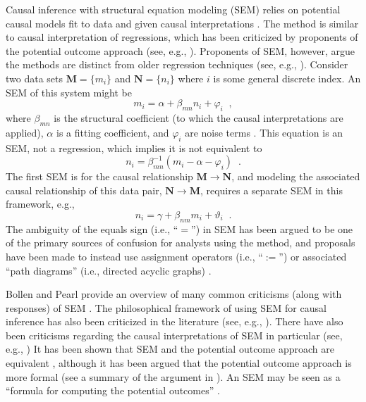 Causal inference with structural equation modeling (SEM) relies on potential causal models fit to data and given causal interpretations \cite{Anderson1988,Pearl2012,Bollen2013,Bollen2014}.  The method is similar to causal interpretation of regressions, which has been criticized by proponents of the potential outcome approach (see, e.g., \cite{Holland1986}).  Proponents of SEM, however, argue the methods are distinct from older regression techniques (see, e.g., \cite{Bollen2013}).  Consider two data sets $\mathbf{M}=\{ m_i \}$ and $\mathbf{N} = \{ n_i \}$ where $i$ is some general discrete index.  An SEM of this system might be
\begin{equation}
m_i = \alpha + \beta_{mn}n_i + \varphi_i\;\;,
\end{equation}
where $\beta_{mn}$ is the structural coefficient (to which the causal interpretations are applied), $\alpha$ is a fitting coefficient, and $\varphi_i$ are noise terms \cite{Anderson1988,Bollen2013,Bollen2014}.  This equation is an SEM, not a regression, which implies it is not equivalent \cite{Bollen2013} to 
\begin{equation}
n_i = \beta_{mn}^{-1}\left(m_i-\alpha-\varphi_i\right)\;\;.
\end{equation}
The first SEM is for the causal relationship $\mathbf{M}\rightarrow\mathbf{N}$, and modeling the associated causal relationship of this data pair, $\mathbf{N}\rightarrow\mathbf{M}$, requires a separate SEM in this framework, e.g., 
\begin{equation}
n_i = \gamma + \beta_{nm}m_i + \vartheta_i \;\;.
\end{equation}
The ambiguity of the equals sign (i.e., ``$=$'') in SEM has been argued to be one of the primary sources of confusion for analysts using the method, and proposals have been made to instead use assignment operators (i.e., ``$:=$'') \cite{Pearl2012} or associated ``path diagrams'' (i.e., directed acyclic graphs) \cite{Pearl2000}.

Bollen and Pearl provide an overview of many common criticisms (along with responses) of SEM \cite{Bollen2013}.  The philosophical framework of using SEM for causal inference has also been criticized in the literature (see, e.g., \cite{Hall2007,Hitchcock2009}).  There have also been criticisms regarding the causal interpretations of SEM in particular (see, e.g., \cite{Biddle1987,Cliff1983}) It has been shown that SEM and the potential outcome approach are equivalent \cite{Bollen2013,Pearl2000,Morgan2014}, although it has been argued that the potential outcome approach is more formal (see a summary of the argument in \cite{Bollen2013}).  An SEM may be seen as a ``formula for computing the potential outcomes'' \cite{Greenland2002}.

